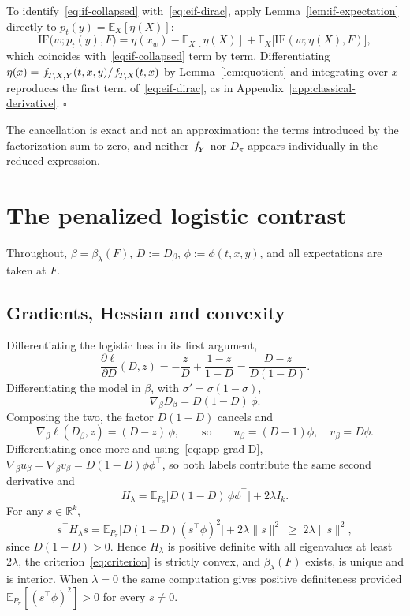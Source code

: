 \documentclass[11pt]{article}
\theoremstyle{plain}
\theoremstyle{definition}
\theoremstyle{remark}
\newcommand{\pE}{\ensuremath{\mathbb{E}}}
\newcommand{\R}{\mathbb{R}}
\newcommand{\pf}[1]{\ensuremath{\,\mathlarger{\textit{f}}_{#1}}}
\newcommand{\ratio}{\ensuremath{\pi}}
\newcommand{\contrast}{D_{\ratio}}
\newcommand{\ks}{k}
\newcommand{\IF}{\mathrm{IF}}
\begin{document}
To identify~\eqref{eq:if-collapsed} with~\eqref{eq:eif-dirac}, apply
Lemma~\ref{lem:if-expectation} directly to $p_t(y) = \pE_X[\eta(X)]$:
\[
\IF\big(w;p_t(y),F\big)
= \eta(x_w) - \pE_X[\eta(X)] + \pE_X\big[ \IF(w;\eta(X),F) \big],
\]
which coincides with~\eqref{eq:if-collapsed} term by term. Differentiating
$\eta(x) = \pf{T,X,Y}(t,x,y)/\pf{T,X}(t,x)$ by Lemma~\ref{lem:quotient} and integrating
over $x$ reproduces the first term of~\eqref{eq:eif-dirac}, as in
Appendix~\ref{app:classical-derivative}. \hfill$\square$

The cancellation is exact and not an approximation: the terms introduced by the
factorization sum to zero, and neither $\pf{Y}$ nor $\contrast$ appears individually in
the reduced expression.

\section{The penalized logistic contrast}
\label{app:logistic}

Throughout, $\beta = \beta_\lambda(F)$, $D := D_\beta$, $\phi := \phi(t,x,y)$, and all
expectations are taken at $F$.

\subsection{Gradients, Hessian and convexity}
\label{app:logistic-grads}

Differentiating the logistic loss in its first argument,
\begin{equation}
\frac{\partial \ell}{\partial D}(D,z)
= -\frac{z}{D} + \frac{1-z}{1-D}
= \frac{D-z}{D(1-D)} .
\label{eq:app-dl}
\end{equation}
Differentiating the model in $\beta$, with $\sigma' = \sigma(1-\sigma)$,
\begin{equation}
\nabla_\beta D_\beta = D(1-D)\,\phi .
\label{eq:app-grad-D}
\end{equation}
Composing the two, the factor $D(1-D)$ cancels and
\begin{equation}
\nabla_\beta \ell(D_\beta,z) = (D-z)\,\phi ,
\qquad\text{so}\qquad
u_\beta = (D-1)\phi, \quad v_\beta = D\phi .
\label{eq:app-uv}
\end{equation}
Differentiating once more and using~\eqref{eq:app-grad-D},
$\nabla_\beta u_\beta = \nabla_\beta v_\beta = D(1-D)\phi\phi^\top$, so both labels
contribute the same second derivative and
\begin{equation}
H_\lambda
= \pE_{P_\ratio}\big[ D(1-D)\,\phi\phi^\top \big] + 2\lambda I_{\ks} .
\label{eq:app-hessian}
\end{equation}
For any $s \in \R^{\ks}$,
\[
s^\top H_\lambda s
= \pE_{P_\ratio}\big[ D(1-D)(s^\top\phi)^2 \big] + 2\lambda\|s\|^2
\;\ge\; 2\lambda\|s\|^2 ,
\]
since $D(1-D) > 0$. Hence $H_\lambda$ is positive definite with all eigenvalues at least
$2\lambda$, the criterion~\eqref{eq:criterion} is strictly convex, and $\beta_\lambda(F)$
exists, is unique and is interior. When $\lambda = 0$ the same computation gives positive
definiteness provided $\pE_{P_\ratio}[(s^\top\phi)^2] > 0$ for every $s \neq 0$.
\end{document}
